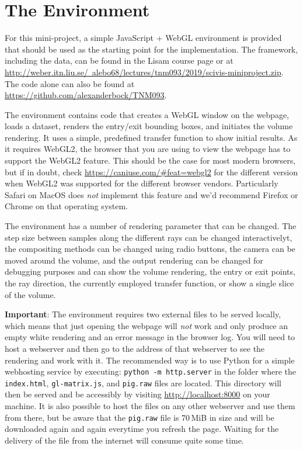 \documentclass{labinstructions}
\begin{document}
\section{The Environment}
For this mini-project, a simple JavaScript + WebGL environment is provided that should be used as the starting point for the implementation.  The framework, including the data, can be found in the Lisam course page or at \href{http://weber.itn.liu.se/~alebo68/lectures/tnm093/2019/scivis-miniproject.zip}{http://weber.itn.liu.se/~alebo68/lectures/tnm093/2019/scivis-miniproject.zip}.  The code alone can also be found at \href{https://github.com/alexanderbock/TNM093}{https://github.com/alexanderbock/TNM093}.

The environment contains code that creates a WebGL window on the webpage, loads a dataset, renders the entry/exit bounding boxes, and initiates the volume rendering.  It uses a simple, predefined transfer function to show initial results.  As it requires WebGL2, the browser that you are using to view the webpage has to support the WebGL2 feature.  This should be the case for most modern browsers, but if in doubt, check \href{https://caniuse.com/\#feat=webgl2}{https://caniuse.com/\#feat=webgl2} for the different version when WebGL2 was supported for the different browser vendors.  Particularly Safari on MacOS does \emph{not} implement this feature and we'd recommend Firefox or Chrome on that operating system.

The environment has a number of rendering parameter that can be changed.  The step size between samples along the different rays can be changed interactivelyt, the compositing methods can be changed using radio buttons, the camera can be moved around the volume, and the output rendering can be changed for debugging purposes and can show the volume rendering, the entry or exit points, the ray direction, the currently employed transfer function, or show a single slice of the volume.

\textbf{Important}: The environment requires two external files to be served locally, which means that just opening the webpage will \emph{not} work and only produce an empty white rendering and an error message in the browser log.  You will need to host a webserver and then go to the address of that webserver to see the rendering and work with it.  The recommended way is to use Python for a simple webhosting service by executing: \texttt{python -m http.server} in the folder where the \texttt{index.html}, \texttt{gl-matrix.js}, and \texttt{pig.raw} files are located.  This directory will then be served and be accessibly by visiting \href{http://localhost:8000}{http://localhost:8000} on your machine.  It is also possible to host the files on any other webserver and use them from there, but be aware that the \texttt{pig.raw} file is 70\,MiB in size and will be downloaded again and again everytime you refresh the page.  Waiting for the delivery of the file from the internet will consume quite some time.
\end{document}
